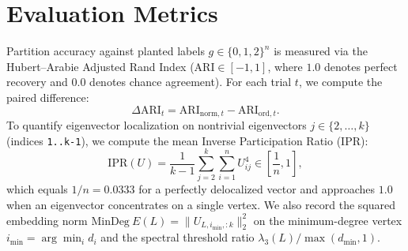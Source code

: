 \documentclass[10pt,twocolumn,a4paper]{article}
\begin{document}
\section{Evaluation Metrics}
Partition accuracy against planted labels $g \in \{0,1,2\}^n$ is measured via the Hubert--Arabie Adjusted Rand Index ($\mathrm{ARI} \in [-1, 1]$, where $1.0$ denotes perfect recovery and $0.0$ denotes chance agreement). For each trial $t$, we compute the paired difference:
\begin{equation}
    \Delta\mathrm{ARI}_t = \mathrm{ARI}_{\mathrm{norm}, t} - \mathrm{ARI}_{\mathrm{ord}, t}.
\end{equation}
To quantify eigenvector localization on nontrivial eigenvectors $j \in \{2, \dots, k\}$ (indices \texttt{1..k-1}), we compute the mean Inverse Participation Ratio (IPR):
\begin{equation}
    \mathrm{IPR}(U) = \frac{1}{k-1} \sum_{j=2}^k \sum_{i=1}^n U_{ij}^4 \in \left[\frac{1}{n}, 1\right],
\end{equation}
which equals $1/n = 0.0333$ for a perfectly delocalized vector and approaches $1.0$ when an eigenvector concentrates on a single vertex. We also record the squared embedding norm $\mathrm{MinDeg\ }E(L) = \|U_{L, i_{\min}, :k}\|_2^2$ on the minimum-degree vertex $i_{\min} = \arg\min_i d_i$ and the spectral threshold ratio $\lambda_3(L) / \max(d_{\min}, 1)$.

\begin{table}[!htbp]
\centering
\caption{Day 7 Controlled Benchmark ($N=30, K=3, n_c=10, p_{\mathrm{in}}=0.65, p_{\mathrm{out}}=0.08$, 30 trials per regime). Expected edge counts are calibrated to $\mathbb{E}[m_{\mathrm{in}}]=87.75$ and $\mathbb{E}[m_{\mathrm{out}}]=24.00$ across all conditions. All 90 graphs are connected ($c=1, n_{\mathrm{iso}}=0$).}
\label{tab:day7_main}
\end{table}
\end{document}

